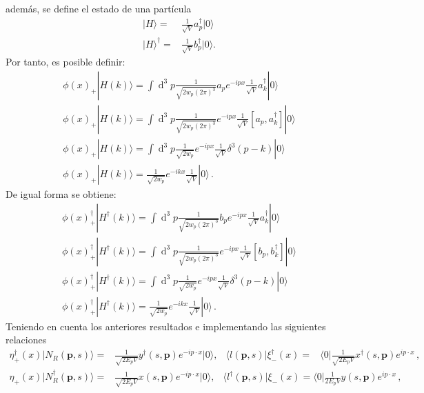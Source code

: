 además, se define el estado de una partícula
\begin{align}
|H\rangle=&\frac{1}{\sqrt{V}}a_p^{\dagger}|0\rangle\nonumber\\
|H\rangle^\dagger=&\frac{1}{\sqrt{V}}b_p^{\dagger}|0\rangle .
\end{align}
Por tanto, es posible definir:
\begin{align}
\phi(x)_+|H(k)\rangle=\int\operatorname{d}^3p\frac{1}{\sqrt{2w_{p}(2\pi)^{3}}}a_pe^{-ipx}\frac{1}{\sqrt{V}}a_k^{\dagger}|0\rangle\\
\label{p2}
\phi(x)_+|H(k)\rangle=\int\operatorname{d}^3p\frac{1}{\sqrt{2w_{p}(2\pi)^{3}}}e^{-ipx}\frac{1}{\sqrt{V}}[a_p,a_k^{\dagger}]|0\rangle\\
\label{3}
\phi(x)_+|H(k)\rangle=\int\operatorname{d}^3p\frac{1}{\sqrt{2w_p}}e^{-ipx}\frac{1}{\sqrt{V}}\delta^{3}(p-k)|0\rangle\\
\label{4}
\phi(x)_+|H(k)\rangle=\frac{1}{\sqrt{2w_{p}{}}}e^{-ikx}\frac{1}{\sqrt{V}}|0\rangle\,.
\end{align}
De igual forma se obtiene:
\begin{align}
\phi(x)^{\dagger}_+|H^\dagger(k)\rangle=\int\operatorname{d}^3p\frac{1}{\sqrt{2w_{p}(2\pi)^{3}}}b_pe^{-ipx}\frac{1}{\sqrt{V}}a_k^{\dagger}|0\rangle\\
\phi(x)^{\dagger}_+|H^\dagger(k)\rangle=\int\operatorname{d}^3p\frac{1}{\sqrt{2w_{p}(2\pi)^{3}}}e^{-ipx}\frac{1}{\sqrt{V}}[b_p,b_k^{\dagger}]|0\rangle\\
\phi(x)^{\dagger}_+|H^\dagger(k)\rangle=\int\operatorname{d}^3p\frac{1}{\sqrt{2w_p}}e^{-ipx}\frac{1}{\sqrt{V}}\delta^{3}(p-k)|0\rangle\\
\phi(x)^{\dagger}_+|H^\dagger(k)\rangle=\frac{1}{\sqrt{2w_{p}{}}}e^{-ikx}\frac{1}{\sqrt{V}}|0\rangle\,.
\end{align}
Teniendo en cuenta los anteriores resultados e implementando las siguientes relaciones
\begin{align}
  \eta_+^{\dagger}(x)|N_R (\boldsymbol{p},s)\rangle=&\frac{1}{\sqrt{2 E_{p} V}}y^{\dagger}(s,\mathbf{p})e^{-i p\cdot x}|0\rangle,&\langle l(\boldsymbol{p},s)|\xi_-^{\dagger}(x)=&\langle 0|\frac{1}{\sqrt{2 E_p V}}x^{\dagger}(s,\mathbf{p})e^{i p\cdot x}\,,
\end{align}
\begin{align}
\eta_+(x)|N_R ^\dagger(\boldsymbol{p},s)\rangle=&\frac{1}{\sqrt{2 E_{p} V}}x(s,\mathbf{p})e^{-i p\cdot x}|0\rangle,&\langle l^\dagger(\boldsymbol{p},s)|\xi_-(x)=\langle 0|\frac{1}{2E_p V}y(s,\mathbf{p})e^{i p\cdot x}\,,
\end{align}
